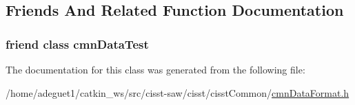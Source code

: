 \subsection{Friends And Related Function Documentation}
\hypertarget{classcmn_data_format_a27ca1c549263a07cbea497037bb4bf31}{
\subsubsection[{cmn\-Data\-Test}]{\setlength{\rightskip}{0pt plus 5cm}friend class cmn\-Data\-Test\hspace{0.3cm}{\ttfamily [friend]}}}\label{classcmn_data_format_a27ca1c549263a07cbea497037bb4bf31}


The documentation for this class was generated from the following file\-:\begin{DoxyCompactItemize}
\item 
/home/adeguet1/catkin\-\_\-ws/src/cisst-\/saw/cisst/cisst\-Common/\hyperlink{cmn_data_format_8h}{cmn\-Data\-Format.\-h}\end{DoxyCompactItemize}
